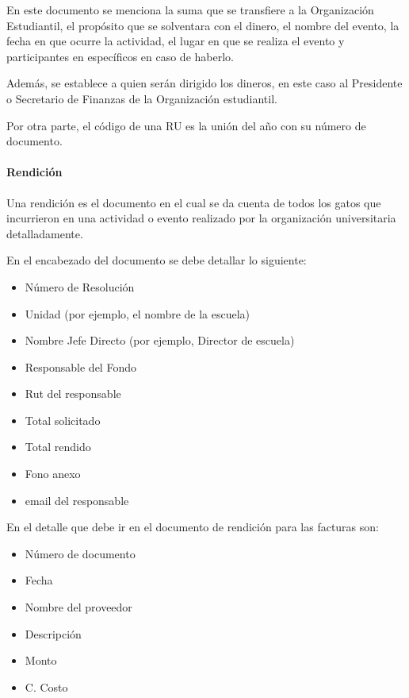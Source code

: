   En este documento se menciona la suma que se transfiere a la Organización Estudiantil, el propósito que se solventara con el dinero, el nombre del evento, la fecha en que ocurre la actividad, el lugar en que se realiza el evento y participantes en específicos en caso de haberlo.

  Además, se establece a quien serán dirigido los dineros, en este caso al Presidente o Secretario de Finanzas de la Organización estudiantil.

  Por otra parte, el código de una RU es la unión del año con su número de documento. 

  \paragraph{Rendición}

  Una rendición es el documento en el cual se da cuenta de todos los gatos que incurrieron en una actividad o evento realizado por la organización universitaria detalladamente. 
  
  En el encabezado del documento se debe detallar lo siguiente:
  
  \begin{itemize}
    \item Número de Resolución
    \item Unidad (por ejemplo, el nombre de la escuela)
    \item Nombre Jefe Directo (por ejemplo, Director de escuela)
    \item Responsable del Fondo
    \item Rut del responsable
    \item Total solicitado
    \item Total rendido
    \item Fono anexo
    \item email del responsable
  \end{itemize}
  
  En el detalle que debe ir en el documento de rendición para las facturas son:
  
  \begin{itemize}
    \item Número de documento
    \item Fecha
    \item Nombre del proveedor
    \item Descripción
    \item Monto
    \item C. Costo
  \end{itemize}
  
